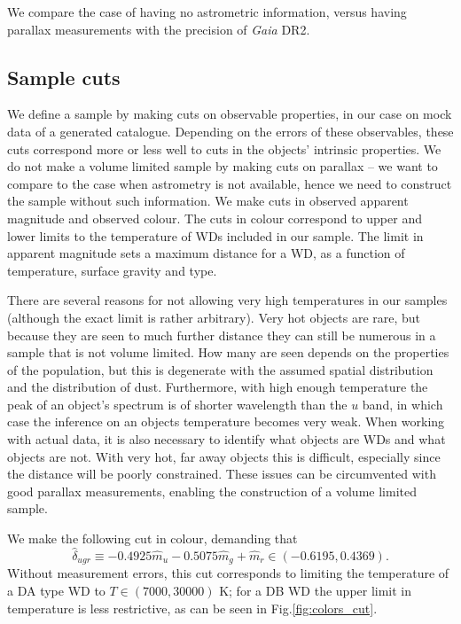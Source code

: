\documentclass[fleqn,usenatbib]{mnras}
\newcommand{\Teff}{T}
\begin{document}
We compare the case of having no astrometric information, versus having parallax measurements with the precision of \emph{Gaia} DR2.

\subsection{Sample cuts}\label{sec:sample_cuts}

We define a sample by making cuts on observable properties, in our case on mock data of a generated catalogue. Depending on the errors of these observables, these cuts correspond more or less well to cuts in the objects' intrinsic properties. We do not make a volume limited sample by making cuts on parallax -- we want to compare to the case when astrometry is not available, hence we need to construct the sample without such information. We make cuts in observed apparent magnitude and observed colour. The cuts in colour correspond to upper and lower limits to the temperature of WDs included in our sample. The limit in apparent magnitude sets a maximum distance for a WD, as a function of temperature, surface gravity and type.

There are several reasons for not allowing very high temperatures in our samples (although the exact limit is rather arbitrary). Very hot objects are rare, but because they are seen to much further distance they can still be numerous in a sample that is not volume limited. How many are seen depends on the properties of the population, but this is degenerate with the assumed spatial distribution and the distribution of dust. Furthermore, with high enough temperature the peak of an object's spectrum is of shorter wavelength than the $u$ band, in which case the inference on an objects temperature becomes very weak. When working with actual data, it is also necessary to identify what objects are WDs and what objects are not. With very hot, far away objects this is difficult, especially since the distance will be poorly constrained. These issues can be circumvented with good parallax measurements, enabling the construction of a volume limited sample.

We make the following cut in colour, demanding that
\begin{equation}
	\hat{\delta}_{ugr} \equiv -0.4925\hat{m}_u-0.5075\hat{m}_g+\hat{m}_r \in (-0.6195,0.4369).
\end{equation}
Without measurement errors, this cut corresponds to limiting the temperature of a DA type WD to $\Teff \in (7000,30000)$ K; for a DB WD the upper limit in temperature is less restrictive, as can be seen in Fig.\ref{fig:colors_cut}.
\end{document}
